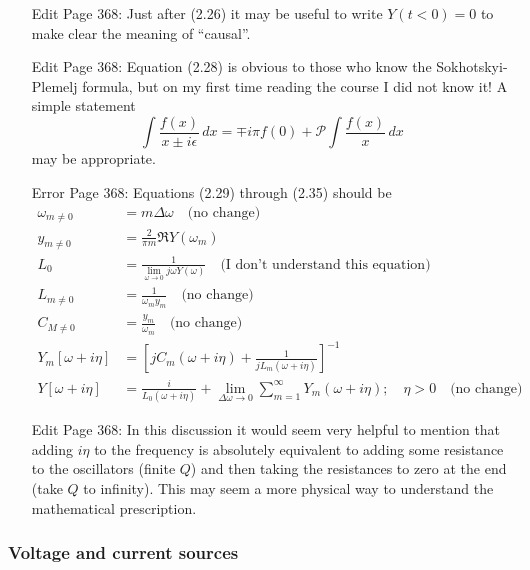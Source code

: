 \begin{itemize}

\item[Edit] Page 368: Just after (2.26) it may be useful to write $Y(t<0)=0$ to make clear the meaning of ``causal''.

\item[Edit] Page 368: Equation (2.28) is obvious to those who know the Sokhotskyi-Plemelj formula, but on my first time reading the course I did not know it! A simple statement
\begin{equation}
\int \frac{f(x)}{x \pm i \epsilon} \, dx =
\mp i \pi f(0) + \mathcal{P} \int \frac{f(x)}{x}\, dx
\end{equation}
may be appropriate.

\item[Error] Page 368: Equations (2.29) through (2.35) should be
\begin{align*}
\omega_{m \neq 0} &= m \Delta \omega \quad \text{(no change)} \\
y_{m \neq 0} &= \frac{2}{\pi m} \Re Y(\omega_m) \\
L_0 &= \frac{1}{\lim_{\omega \rightarrow 0} j \omega Y(\omega)} \quad \text{(I don't understand this equation)} \\
L_{m \neq 0} &= \frac{1}{\omega_m y_m} \quad \text{(no change)} \\
C_{M \neq 0} &= \frac{y_m}{\omega_m} \quad \text{(no change)} \\
Y_m [\omega + i \eta] &= \left[ j C_m(\omega + i \eta) + \frac{1}{j L_m (\omega + i \eta)} \right] ^{-1} \\
Y[\omega + i \eta] &= \frac{i}{L_0(\omega + i \eta)} + \lim_{\Delta \omega \rightarrow 0}
\sum_{m=1}^\infty Y_m(\omega + i \eta); \quad \eta > 0 \quad \text{(no change)}
\end{align*}

\item[Edit] Page 368: In this discussion it would seem very helpful to mention that adding $i \eta$ to the frequency is absolutely equivalent to adding some resistance to the oscillators (finite $Q$) and then taking the resistances to zero at the end (take $Q$ to infinity). This may seem a more physical way to understand the mathematical prescription.

\end{itemize}

\subsubsection{Voltage and current sources}

